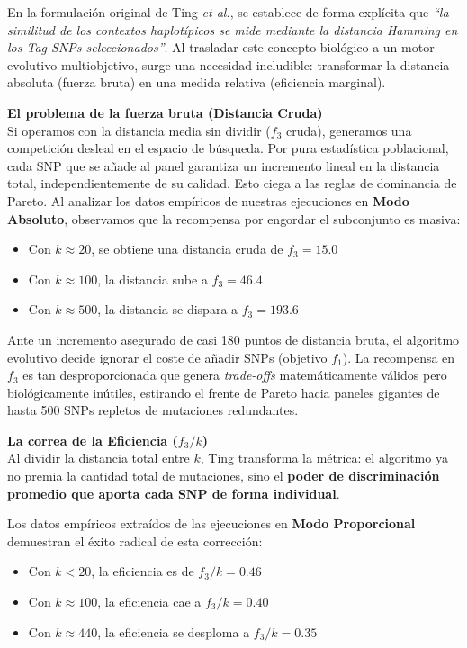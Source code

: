 \documentclass[11pt,a4paper]{article}
\begin{document}
En la formulación original de Ting \textit{et al.}, se establece de forma explícita que \textit{``la similitud de los contextos haplotípicos se mide mediante la distancia Hamming en los Tag SNPs seleccionados''}. Al trasladar este concepto biológico a un motor evolutivo multiobjetivo, surge una necesidad ineludible: transformar la distancia absoluta (fuerza bruta) en una medida relativa (eficiencia marginal).

\textbf{El problema de la fuerza bruta (Distancia Cruda)}\\
Si operamos con la distancia media sin dividir ($f_3$ cruda), generamos una competición desleal en el espacio de búsqueda. Por pura estadística poblacional, cada SNP que se añade al panel garantiza un incremento lineal en la distancia total, independientemente de su calidad. 
Esto ciega a las reglas de dominancia de Pareto. Al analizar los datos empíricos de nuestras ejecuciones en \textbf{Modo Absoluto}, observamos que la recompensa por engordar el subconjunto es masiva:
\begin{itemize}
    \item Con $k \approx 20$, se obtiene una distancia cruda de $f_3 = 15.0$
    \item Con $k \approx 100$, la distancia sube a $f_3 = 46.4$
    \item Con $k \approx 500$, la distancia se dispara a $f_3 = 193.6$
\end{itemize}

Ante un incremento asegurado de casi 180 puntos de distancia bruta, el algoritmo evolutivo decide ignorar el coste de añadir SNPs (objetivo $f_1$). La recompensa en $f_3$ es tan desproporcionada que genera \textit{trade-offs} matemáticamente válidos pero biológicamente inútiles, estirando el frente de Pareto hacia paneles gigantes de hasta 500 SNPs repletos de mutaciones redundantes.

\textbf{La correa de la Eficiencia ($f_3 / k$)}\\
Al dividir la distancia total entre $k$, Ting transforma la métrica: el algoritmo ya no premia la cantidad total de mutaciones, sino el \textbf{poder de discriminación promedio que aporta cada SNP de forma individual}. 

Los datos empíricos extraídos de las ejecuciones en \textbf{Modo Proporcional} demuestran el éxito radical de esta corrección:
\begin{itemize}
    \item Con $k < 20$, la eficiencia es de $f_3/k = \mathbf{0.46}$
    \item Con $k \approx 100$, la eficiencia cae a $f_3/k = \mathbf{0.40}$
    \item Con $k \approx 440$, la eficiencia se desploma a $f_3/k = \mathbf{0.35}$
\end{itemize}
\end{document}
